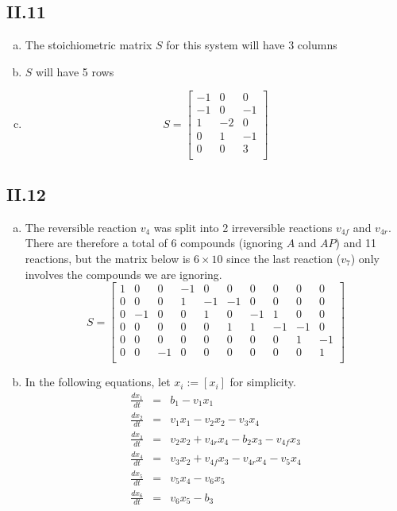 \documentclass[a4paper, 10pt]{article}
\begin{document}
\subsection*{II.11}
\begin{enumerate}[a)]
  \item The stoichiometric matrix $S$ for this system will have 3 columns
  \item $S$ will have 5 rows
  \item \[ S =
\begin{bmatrix}
-1 &  0 &  0 \\
-1 &  0 & -1 \\
 1 & -2 &  0 \\
 0 &  1 & -1 \\
 0 &  0 &  3 \\
\end{bmatrix} \]
\end{enumerate}


\subsection*{II.12}
\begin{enumerate}[a)]
  \item The reversible reaction $v_4$ was split into 2 irreversible reactions $v_{4f}$ and $v_{4r}$. There are therefore a total of 6 compounds (ignoring $A$ and $AP$) and 11 reactions, but the matrix below is $6 \times 10$ since the last reaction ($v_7$) only involves the compounds we are ignoring. \[ S =
\begin{bmatrix}
1 & 0  & 0  & -1 & 0  & 0  & 0  & 0  & 0  & 0  \\
0 & 0  & 0  & 1  & -1 & -1 & 0  & 0  & 0  & 0  \\
0 & -1 & 0  & 0  & 1  & 0  & -1 & 1  & 0  & 0  \\
0 & 0  & 0  & 0  & 0  & 1  & 1  & -1 & -1 & 0  \\
0 & 0  & 0  & 0  & 0  & 0  & 0  & 0  & 1  & -1 \\
0 & 0  & -1 & 0  & 0  & 0  & 0  & 0  & 0  & 1  \\
\end{bmatrix}
\]
  \item In the following equations, let $x_i := [x_i]$ for simplicity.
\begin{eqnarray}
\frac{dx_1}{dt} &=& b_1 - v_1 x_1                               \nonumber \\
\frac{dx_2}{dt} &=& v_1 x_1 - v_2 x_2 - v_3 x_4                 \nonumber \\
\frac{dx_3}{dt} &=& v_2 x_2 + v_{4r} x_4 - b_2 x_3 - v_{4f} x_3 \nonumber \\
\frac{dx_4}{dt} &=& v_3 x_2 + v_{4f} x_3 - v_{4r} x_4 - v_5 x_4 \nonumber \\
\frac{dx_5}{dt} &=& v_5 x_4 - v_6 x_5                           \nonumber \\
\frac{dx_6}{dt} &=& v_6 x_5 - b_3                               \nonumber
\end{eqnarray}
\end{enumerate}
\end{document}
